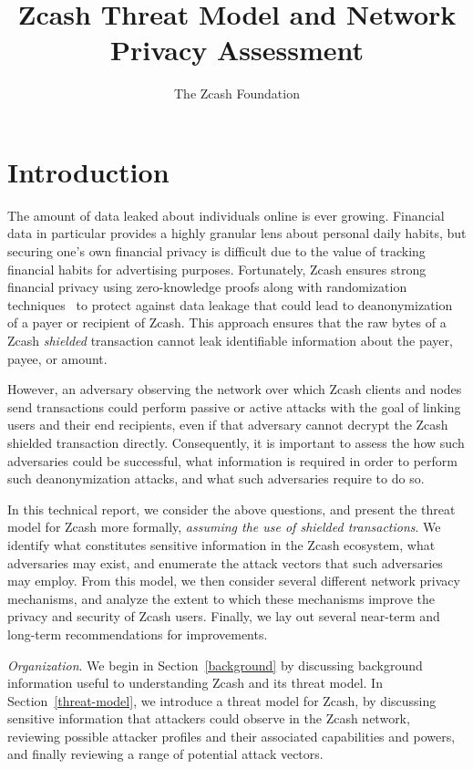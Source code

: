 \documentclass{article}
\title{Zcash Threat Model and Network Privacy Assessment}
\author{The Zcash Foundation}
\begin{document}
    \maketitle
\section{Introduction}

The amount of data leaked about individuals online is ever growing.
Financial data in particular
provides a highly granular lens about personal daily habits, but securing one's
own financial privacy is difficult due to the value of tracking financial
habits for advertising purposes. Fortunately, Zcash ensures strong financial
privacy using zero-knowledge proofs along with randomization
techniques~\cite{zcash-spec} to
protect against data leakage that could lead to deanonymization of a payer or
recipient of Zcash. This approach ensures that the raw bytes of a
Zcash \emph{shielded} transaction cannot leak identifiable information about the
payer, payee, or amount.

However, an adversary observing the network over which Zcash clients and nodes
send transactions could perform passive or active attacks with the goal of
linking
users and their end recipients, even if that adversary cannot decrypt the Zcash
shielded transaction directly. Consequently, it is important to assess the
how such adversaries could be successful, what information is required in order
to perform such deanonymization attacks, and what such adversaries require to
do so.

In this technical report, we consider the above questions, and present the
threat model for Zcash more formally, \textit{assuming the use of shielded
transactions}. We identify what constitutes sensitive information in the Zcash
ecosystem, what adversaries may exist, and enumerate the attack vectors that
such adversaries may employ. From this model, we then consider several
different network privacy mechanisms, and analyze the extent to which these
mechanisms improve the privacy and security of Zcash users. Finally, we lay out
several near-term and long-term recommendations for improvements.

\textit{Organization}.
We begin in Section~\ref{background} by discussing background information
useful to understanding Zcash and its threat model. In
Section~\ref{threat-model}, we introduce a threat model for Zcash, by
discussing sensitive information that attackers could observe in the Zcash
network, reviewing possible attacker profiles and their associated
capabilities and powers, and finally reviewing a range of potential attack
vectors.
\end{document}
